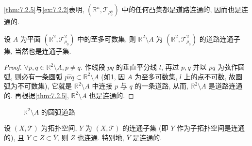 \cref{thm:7.2.5}与\cref{ex:7.2.2}表明, $(\mathbb{R}^{n}, \mathcal{T}_{\rho_{0}^{n}})$ 中的任何凸集都是道路连通的, 因而也是连通的.

\begin{example}\label{ex:7.2.4}
设 $A$ 为平面 $(\mathbb{R}^2, \mathcal{T}_{\rho_0}^2)$ 中的至多可数集, 则 $\mathbb{R}^2 \setminus A$ 为 $(\mathbb{R}^2, \mathcal{T}_{\rho_0}^2)$ 的道路连通子集, 当然也是连通子集.
\end{example}

\begin{proof}
$\forall p, q \in \mathbb{R}^2 \setminus A, p \neq q$. 作线段 $\overline{pq}$ 的垂直平分线 $l$, 再过 $p, q$ 并以 $\overline{pq}$ 为弦作圆弧, 则必有一条圆弧 $\overset{\frown}{prq} \subset \mathbb{R}^2 \setminus A$ (如\cref{fig:7.2.5}, 因 $A$ 为至多可数集, $l$ 上的点不可数, 故圆弧为不可数集), 它就是 $\mathbb{R}^2 \setminus A$ 中连接 $p$ 与 $q$ 的一条道路, 从而, $\mathbb{R}^2 \setminus A$ 是道路连通的. 再根据\cref{thm:7.2.5}, $\mathbb{R}^2 \setminus A$ 也是连通的.
\end{proof}

\begin{figure}[htbp]
  \centering
  \caption{$\mathbb{R}^2 \setminus A$ 的圆弧道路}\label{fig:7.2.5}
\end{figure}

\begin{theorem}\label{thm:7.2.6}
设 $(X, \mathcal{T})$ 为拓扑空间, $Y$ 为 $(X, \mathcal{T})$ 的连通子集 (即 $Y$ 作为子拓扑空间是连通的), 且 $Y \subset Z \subset \overline{Y}$, 则 $Z$ 也连通. 特别地, $\overline{Y}$ 是连通的.
\end{theorem}

